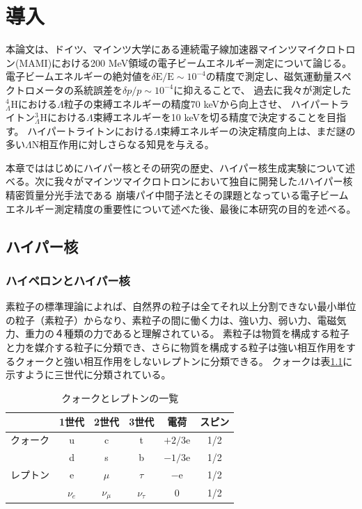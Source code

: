 \documentclass[a4paper,11pt,uplatex]{jsbook}
\begin{document}
\chapter{導入}
本論文は、ドイツ、マインツ大学にある連続電子線加速器マインツマイクロトロン(MAMI)における200 MeV領域の電子ビームエネルギー測定について論じる。
電子ビームエネルギーの絶対値を$\delta \text{E}/\text{E} \sim 10^{-4}$の精度で測定し、磁気運動量スペクトロメータの系統誤差を$\delta p/p \sim 10^{-4}$に抑えることで、
過去に我々が測定した$^4_{\Lambda} \text{H}$における$\Lambda$粒子の束縛エネルギーの精度$70$ keVから向上させ、
ハイパートライトン$^3_{\Lambda}\text{H}$における$\Lambda$束縛エネルギーを10 keVを切る精度で決定することを目指す。
ハイパートライトンにおける$\Lambda$束縛エネルギーの決定精度向上は、まだ謎の多い$\Lambda$N相互作用に対しさらなる知見を与える。

本章でははじめにハイパー核とその研究の歴史、ハイパー核生成実験について述べる。次に我々がマインツマイクロトロンにおいて独自に開発した$\Lambda$ハイパー核精密質量分光手法である
崩壊パイ中間子法とその課題となっている電子ビームエネルギー測定精度の重要性について述べた後、最後に本研究の目的を述べる。
\section{ハイパー核}

\subsection{ハイペロンとハイパー核}
素粒子の標準理論によれば、自然界の粒子は全てそれ以上分割できない最小単位の粒子（素粒子）からなり、素粒子の間に働く力は、強い力、弱い力、電磁気力、重力の４種類の力であると理解されている。
素粒子は物質を構成する粒子と力を媒介する粒子に分類でき、さらに物質を構成する粒子は強い相互作用をするクォークと強い相互作用をしないレプトンに分類できる。
クォークは表\ref{tab:quark}に示すように三世代に分類されている。
\begin{table}[h]
\centering
\begin{tabular}{c||c|c|c||c|c}
  \hline
  & 1世代 & 2世代 & 3世代 & 電荷 & スピン\\
  \hline\hline
  クォーク & u & c & t & $+2/3$e & 1/2\\
  & d & s & b & $-1/3$e & 1/2\\ \hline
  レプトン & e& $\mu$& $\tau$& $-$e& 1/2\\
  &$\nu_e$ & $\nu_\mu$& $\nu_\tau$& 0 & 1/2\\
  \hline
\end{tabular}
\caption{クォークとレプトンの一覧}\label{tab:quark}
\end{table}
\end{document}
